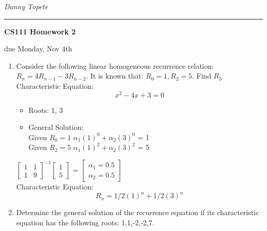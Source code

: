 \documentclass[11pt]{article}
\newcommand{\student}[1]{{\noindent\Large\em {#1} \hfill}\vskip 0.1in}
\newcommand{\assignment}[1]{\centerline{\large\bf CS111 Homework {#1}}}
\newcommand{\duedate}[1]{{\centerline{due {#1}}}}
\newcounter{prnum}
\newenvironment{problem}{{\vskip 0.2in\noindent\bf Problem
       \addtocounter{prnum}{1} \arabic{prnum}.}}{\vskip 0.1in}
\begin{document}
\student{Danny Topete} %
\vskip 0.1in\noindent\hrule\vskip 0.2in
\assignment{2}                           %
\duedate{Monday, Nov 4th}              %


\begin{problem}
\begin{enumerate}[label=\alph*)]
    \item Consider the following linear homogeneous recurrence relation: $R_n = 4R_{n-1} - 3R_{n-2}.$
      It is known that: $R_0 = 1, R_2 = 5$. Find $R_3$\\

      Characteristic Equation: 
      \begin{equation*}
        x^2 - 4x + 3 = 0
      \end{equation*}
      \begin{itemize}
        \item Roots: 1, 3
        \item General Solution: \\
         Given $R_0 = 1$ \Rightarrow $\alpha_1(1)^0 + \alpha_2(3)^0$ = 1\\
         Given $R_2 = 5$ \Rightarrow $\alpha_1(1)^2 + \alpha_2(3)^2$ = 5


      \end{itemize}

        $\begin{bmatrix} 1 & 1 \\ 1 & 9 \end{bmatrix}^{-1} \begin{bmatrix} 1 \\ 5 \end{bmatrix}$ = 
        $\begin{bmatrix} \alpha_1 = 0.5\\ \alpha_2 = 0.5 \end{bmatrix}$\\

      Characteristic Equation: 
      \begin{equation}
        R_n = 1/2 (1)^n + 1/2 (3)^n
      \end{equation}

    \item Determine the general solution of the recurrence equation if its characteristic
      equation has the following roots: 1,1,-2,-2,7.\\



\end{enumerate}
\end{problem}
\end{document}
